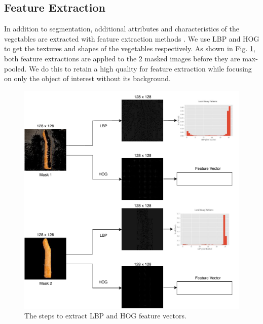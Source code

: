 \subsection{Feature Extraction}
In addition to segmentation, additional attributes and characteristics of the vegetables are extracted with feature extraction methods \cite{b4_4}. We use LBP and HOG to get the textures and shapes of the vegetables respectively. As shown in Fig. \ref{fig:lbp_hog}, both feature extractions are applied to the 2 masked images before they are max-pooled. We do this to retain a high quality for feature extraction while focusing on only the object of interest without its background.

\begin{figure}[tp]
	\centerline{\includegraphics[scale=0.5]{./img/lbp_hog.pdf}}
	\caption{The steps to extract LBP and HOG feature vectors.}
	\label{fig:lbp_hog}
\end{figure}